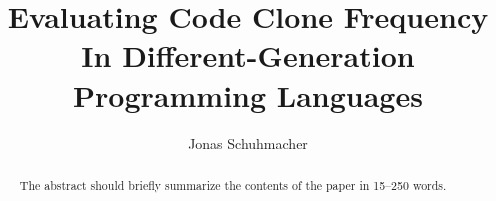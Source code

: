 \documentclass[runningheads]{llncs}
\begin{document}
%
\title{Evaluating Code Clone Frequency In Different-Generation Programming Languages}
%
%
%
\author{Jonas Schuhmacher}
%
\maketitle %
%
%
\begin{abstract}
The abstract should briefly summarize the contents of the paper in
15--250 words.
\end{abstract}
%
%







%
%
\appendix

%
%


%
\end{document}
